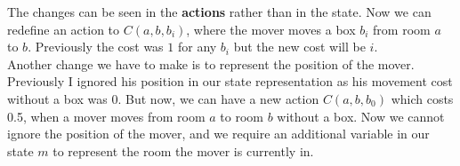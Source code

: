 \begin{enumerate}
        The changes can be seen in the \textbf{actions} rather than in the state. Now we can redefine an action to $C(a,b,b_i)$, where the mover moves a box $b_i$ from room $a$ to $b$. Previously the cost was $1$ for any $b_i$ but the new cost will be $i$.\\
        Another change we have to make is to represent the position of the mover. Previously I ignored his position in our state representation as his movement cost without a box was 0. But now, we can have a new action $C(a,b,b_0)$ which costs 0.5, when a mover moves from room $a$ to room $b$ without a box. Now we cannot ignore the position of the mover, and we require an additional variable in our state $m$ to represent the room the mover is currently in.
\end{enumerate}
